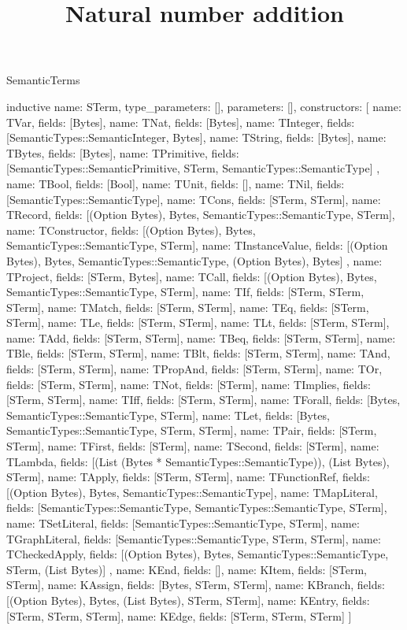 \begin{lexlean}{SemanticTerms}
\title{Natural number addition}
\begin{semanticmodule}
inductive{
  name: STerm,
  type_parameters: [],
  parameters: [],
  constructors: [
    {name: TVar, fields: [Bytes]},
    {name: TNat, fields: [Bytes]},
    {name: TInteger, fields: [SemanticTypes::SemanticInteger, Bytes]},
    {name: TString, fields: [Bytes]},
    {name: TBytes, fields: [Bytes]},
    {
      name: TPrimitive,
      fields: [SemanticTypes::SemanticPrimitive, STerm, SemanticTypes::SemanticType]
    },
    {name: TBool, fields: [Bool]},
    {name: TUnit, fields: []},
    {name: TNil, fields: [SemanticTypes::SemanticType]},
    {name: TCons, fields: [STerm, STerm]},
    {name: TRecord, fields: [(Option Bytes), Bytes, SemanticTypes::SemanticType, STerm]},
    {name: TConstructor, fields: [(Option Bytes), Bytes, SemanticTypes::SemanticType, STerm]},
    {
      name: TInstanceValue,
      fields: [(Option Bytes), Bytes, SemanticTypes::SemanticType, (Option Bytes), Bytes]
    },
    {name: TProject, fields: [STerm, Bytes]},
    {name: TCall, fields: [(Option Bytes), Bytes, SemanticTypes::SemanticType, STerm]},
    {name: TIf, fields: [STerm, STerm, STerm]},
    {name: TMatch, fields: [STerm, STerm]},
    {name: TEq, fields: [STerm, STerm]},
    {name: TLe, fields: [STerm, STerm]},
    {name: TLt, fields: [STerm, STerm]},
    {name: TAdd, fields: [STerm, STerm]},
    {name: TBeq, fields: [STerm, STerm]},
    {name: TBle, fields: [STerm, STerm]},
    {name: TBlt, fields: [STerm, STerm]},
    {name: TAnd, fields: [STerm, STerm]},
    {name: TPropAnd, fields: [STerm, STerm]},
    {name: TOr, fields: [STerm, STerm]},
    {name: TNot, fields: [STerm]},
    {name: TImplies, fields: [STerm, STerm]},
    {name: TIff, fields: [STerm, STerm]},
    {name: TForall, fields: [Bytes, SemanticTypes::SemanticType, STerm]},
    {name: TLet, fields: [Bytes, SemanticTypes::SemanticType, STerm, STerm]},
    {name: TPair, fields: [STerm, STerm]},
    {name: TFirst, fields: [STerm]},
    {name: TSecond, fields: [STerm]},
    {name: TLambda, fields: [(List (Bytes * SemanticTypes::SemanticType)), (List Bytes), STerm]},
    {name: TApply, fields: [STerm, STerm]},
    {name: TFunctionRef, fields: [(Option Bytes), Bytes, SemanticTypes::SemanticType]},
    {name: TMapLiteral, fields: [SemanticTypes::SemanticType, SemanticTypes::SemanticType, STerm]},
    {name: TSetLiteral, fields: [SemanticTypes::SemanticType, STerm]},
    {name: TGraphLiteral, fields: [SemanticTypes::SemanticType, STerm, STerm]},
    {
      name: TCheckedApply,
      fields: [(Option Bytes), Bytes, SemanticTypes::SemanticType, STerm, (List Bytes)]
    },
    {name: KEnd, fields: []},
    {name: KItem, fields: [STerm, STerm]},
    {name: KAssign, fields: [Bytes, STerm, STerm]},
    {name: KBranch, fields: [(Option Bytes), Bytes, (List Bytes), STerm, STerm]},
    {name: KEntry, fields: [STerm, STerm, STerm]},
    {name: KEdge, fields: [STerm, STerm, STerm]}
  ]
}


\end{semanticmodule}
\end{lexlean}
